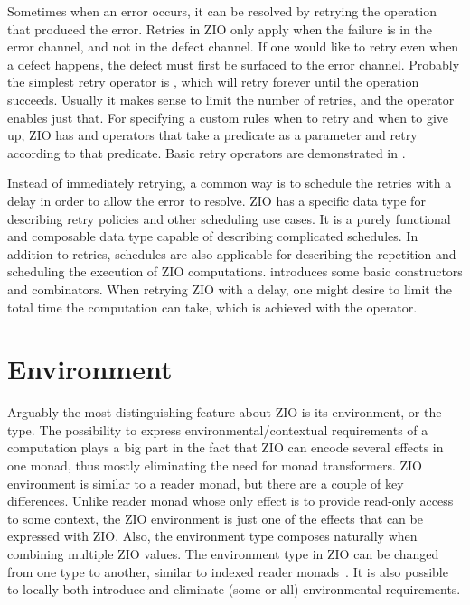 

Sometimes when an error occurs, it can be resolved by retrying the operation that produced the error. Retries in ZIO only apply when the failure is in the error channel, and not in the defect channel. If one would like to retry even when a defect happens, the defect must first be surfaced to the error channel. Probably the simplest retry operator is , which will retry forever until the operation succeeds. Usually it makes sense to limit the number of retries, and the  operator enables just that. For specifying a custom rules when to retry and when to give up, ZIO has  and  operators that take a predicate as a parameter and retry according to that predicate. Basic retry operators are demonstrated in .



Instead of immediately retrying, a common way is to schedule the retries with a delay in order to allow the error to resolve. ZIO has a specific data type  for describing retry policies and other scheduling use cases. It is a purely functional and composable data type capable of describing complicated schedules. In addition to retries, schedules are also applicable for describing the repetition and scheduling the execution of ZIO computations.  introduces some basic  constructors and combinators. When retrying ZIO with a delay, one might desire to limit the total time the computation can take, which is achieved with the  operator.





\section{Environment}
Arguably the most distinguishing feature about ZIO is its environment, or the  type. The possibility to express environmental/contextual requirements of a computation plays a big part in the fact that ZIO can encode several effects in one monad, thus mostly eliminating the need for monad transformers. ZIO environment is similar to a reader monad, but there are a couple of key differences. Unlike reader monad whose only effect is to provide read-only access to some context, the ZIO environment is just one of the effects that can be expressed with ZIO. Also, the environment type composes naturally when combining multiple ZIO values. The environment type in ZIO can be changed from one type to another, similar to indexed reader monads~\cite{monad-factory}. It is also possible to locally both introduce and eliminate (some or all) environmental requirements.

